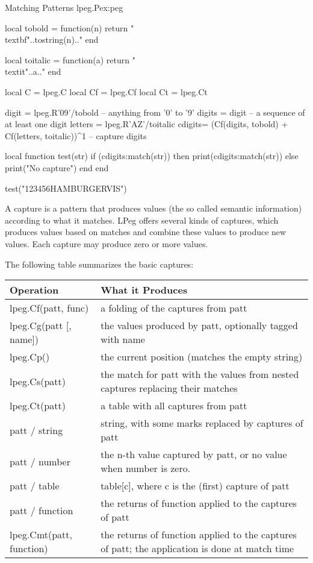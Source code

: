 \begin{texexample}{Matching Patterns lpeg.P}{ex:peg}
\begin{luacode}
local tobold = function(n)
         return "\\textbf{"..tostring(n).."}%
      end
      
local toitalic = function(a)      
        return "\\textit{"..a.."}%
      end  
      
local C  = lpeg.C
local Cf = lpeg.Cf
local Ct = lpeg.Ct
 
digit = lpeg.R'09'/tobold   --  anything from '0' to '9'
digits = digit              --  a sequence of at least one digit
letters = lpeg.R'AZ'/toitalic
cdigits= (Cf(digits, tobold) + Cf(letters, toitalic))^1  --  capture digits
 
 local function test(str)
    if (cdigits:match(str)) then
      print(cdigits:match(str))
    else
      print("No capture")
    end
  end
  
test("123456HAMBURGERVIS")
\end{luacode}
\end{texexample}


A capture is a pattern that produces values (the so called semantic information) according to what it matches. LPeg offers several kinds of captures, which produces values based on matches and combine these values to produce new values. Each capture may produce zero or more values.

The following table summarizes the basic captures:
\label{tbl:peg}
\nobreak
\begin{longtable}[c]{|l|p{8cm}|}
\hline
Operation	   &What it Produces\\
\hline

lpeg.Cf(patt, func)	&a folding of the captures from patt\\
lpeg.Cg(patt [, name])	&the values produced by patt, optionally tagged with name\\
lpeg.Cp()	&the current position (matches the empty string)\\
lpeg.Cs(patt)	&the match for patt with the values from nested captures replacing their matches\\
lpeg.Ct(patt)	&a table with all captures from patt\\
patt / string	&string, with some marks replaced by captures of patt\\
patt / number	&the n-th value captured by patt, or no value when number is zero.\\
patt / table	&table[c], where c is the (first) capture of patt\\
patt / function	&the returns of function applied to the captures of patt\\
lpeg.Cmt(patt, function)	&the returns of function applied to the captures of patt; the application is done at match time\\
\hline
\end{longtable}





